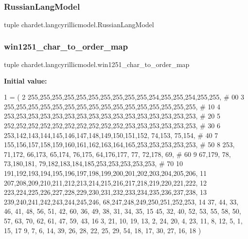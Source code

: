 \subsubsection{\texorpdfstring{Russian\+Lang\+Model}{RussianLangModel}}
{\footnotesize\ttfamily tuple chardet.\+langcyrillicmodel.\+Russian\+Lang\+Model}

\mbox{\label{namespacechardet_1_1langcyrillicmodel_a11177f32efae9860304207fbad8c9243}} 
\subsubsection{\texorpdfstring{win1251\+\_\+char\+\_\+to\+\_\+order\+\_\+map}{win1251\_char\_to\_order\_map}}
{\footnotesize\ttfamily tuple chardet.\+langcyrillicmodel.\+win1251\+\_\+char\+\_\+to\+\_\+order\+\_\+map}

{\bfseries Initial value\+:}
\begin{DoxyCode}
1 =  (
2 255,255,255,255,255,255,255,255,255,255,254,255,255,254,255,255,  \textcolor{comment}{# 00}
3 255,255,255,255,255,255,255,255,255,255,255,255,255,255,255,255,  \textcolor{comment}{# 10}
4 253,253,253,253,253,253,253,253,253,253,253,253,253,253,253,253,  \textcolor{comment}{# 20}
5 252,252,252,252,252,252,252,252,252,252,253,253,253,253,253,253,  \textcolor{comment}{# 30}
6 253,142,143,144,145,146,147,148,149,150,151,152, 74,153, 75,154,  \textcolor{comment}{# 40}
7 155,156,157,158,159,160,161,162,163,164,165,253,253,253,253,253,  \textcolor{comment}{# 50}
8 253, 71,172, 66,173, 65,174, 76,175, 64,176,177, 77, 72,178, 69,  \textcolor{comment}{# 60}
9  67,179, 78, 73,180,181, 79,182,183,184,185,253,253,253,253,253,  \textcolor{comment}{# 70}
10 191,192,193,194,195,196,197,198,199,200,201,202,203,204,205,206,
11 207,208,209,210,211,212,213,214,215,216,217,218,219,220,221,222,
12 223,224,225,226,227,228,229,230,231,232,233,234,235,236,237,238,
13 239,240,241,242,243,244,245,246, 68,247,248,249,250,251,252,253,
14  37, 44, 33, 46, 41, 48, 56, 51, 42, 60, 36, 49, 38, 31, 34, 35,
15  45, 32, 40, 52, 53, 55, 58, 50, 57, 63, 70, 62, 61, 47, 59, 43,
16   3, 21, 10, 19, 13,  2, 24, 20,  4, 23, 11,  8, 12,  5,  1, 15,
17   9,  7,  6, 14, 39, 26, 28, 22, 25, 29, 54, 18, 17, 30, 27, 16,
18 )
\end{DoxyCode}
\mbox{\label{namespacechardet_1_1langcyrillicmodel_a83596b8b4e5d1a7bca55cef8ed9538c9}} 
